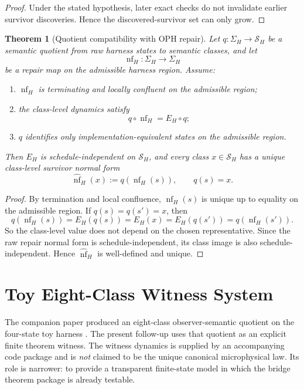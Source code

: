 \documentclass[11pt]{article}
\newtheorem{theorem}{Theorem}[section]
\theoremstyle{remark}
\theoremstyle{plain}
\begin{document}
\begin{proof}
Under the stated hypothesis, later exact checks do not invalidate earlier survivor discoveries. Hence the discovered-survivor set can only grow.
\end{proof}

\begin{theorem}[Quotient compatibility with OPH repair]
\label{thm:compatibility}
Let \(q:\Sigma_H\to \mathcal S_H\) be a semantic quotient from raw harness states to semantic classes, and let
\[
\operatorname{nf}_H:\Sigma_H\to\Sigma_H
\]
be a repair map on the admissible harness region. Assume:
\begin{enumerate}[label=(Q\arabic*),leftmargin=2em]
\item \(\operatorname{nf}_H\) is terminating and locally confluent on the admissible region;
\item the class-level dynamics satisfy
\[
q\circ \operatorname{nf}_H = E_H\circ q;
\]
\item \(q\) identifies only implementation-equivalent states on the admissible region.
\end{enumerate}
Then \(E_H\) is schedule-independent on \(\mathcal S_H\), and every class \(x\in\mathcal S_H\) has a unique class-level survivor normal form
\[
\widehat{\operatorname{nf}}_H(x):=q(\operatorname{nf}_H(s)),
\qquad q(s)=x.
\]
\end{theorem}

\begin{proof}
By termination and local confluence, \(\operatorname{nf}_H(s)\) is unique up to equality on the admissible region. If \(q(s)=q(s')=x\), then
\[
q(\operatorname{nf}_H(s))
=
E_H(q(s))
=
E_H(x)
=
E_H(q(s'))
=
q(\operatorname{nf}_H(s')).
\]
So the class-level value does not depend on the chosen representative. Since the raw repair normal form is schedule-independent, its class image is also schedule-independent. Hence \(\widehat{\operatorname{nf}}_H\) is well-defined and unique.
\end{proof}

\section{Toy Eight-Class Witness System}
\label{sec:toy}

The companion paper produced an eight-class observer-semantic quotient on the four-state toy harness \cite{muller2026quotients}. The present follow-up uses that quotient as an explicit finite theorem witness. The witness dynamics is supplied by an accompanying code package and is \emph{not} claimed to be the unique canonical microphysical law. Its role is narrower: to provide a transparent finite-state model in which the bridge theorem package is already testable.
\end{document}
